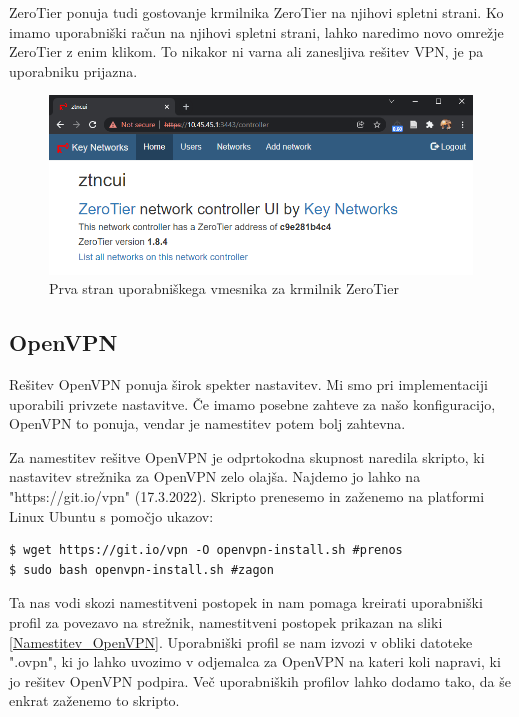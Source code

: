 \documentclass[a4paper, 12pt]{book}
\begin{document}
ZeroTier ponuja tudi gostovanje krmilnika ZeroTier na njihovi spletni strani. Ko imamo uporabniški račun na njihovi spletni strani, lahko naredimo novo omrežje ZeroTier z enim klikom. To nikakor ni varna ali zanesljiva rešitev VPN, je pa uporabniku prijazna.


\begin{figure}[h]
\begin{center}
\includegraphics[width=1\textwidth]{fotografije/ztncui_posnetek zaslona.png}
\end{center}
\caption{Prva stran uporabniškega vmesnika za krmilnik ZeroTier \cite{rvidmar}}
\label{ZeroTier_UI}
\end{figure}

\subsection{OpenVPN}

Rešitev OpenVPN ponuja širok spekter nastavitev. Mi smo pri implementaciji uporabili privzete nastavitve. Če imamo posebne zahteve za našo konfiguracijo, OpenVPN to ponuja, vendar je namestitev potem bolj zahtevna.

Za namestitev rešitve OpenVPN je odprtokodna skupnost naredila skripto, ki nastavitev strežnika za OpenVPN zelo olajša. Najdemo jo lahko na "https://git.io/vpn" (17.3.2022). Skripto prenesemo in zaženemo na platformi Linux Ubuntu s pomočjo ukazov:
\begin{verbatim}
$ wget https://git.io/vpn -O openvpn-install.sh #prenos
$ sudo bash openvpn-install.sh #zagon
\end{verbatim}

Ta nas vodi skozi namestitveni postopek in nam pomaga kreirati uporabniški profil za povezavo na strežnik, namestitveni postopek prikazan na sliki \ref{Namestitev_OpenVPN}. Uporabniški profil se nam izvozi v obliki datoteke ".ovpn", ki jo lahko uvozimo v odjemalca za OpenVPN na kateri koli napravi, ki jo rešitev OpenVPN podpira. Več uporabniških profilov lahko dodamo tako, da še enkrat zaženemo to skripto.
\end{document}
